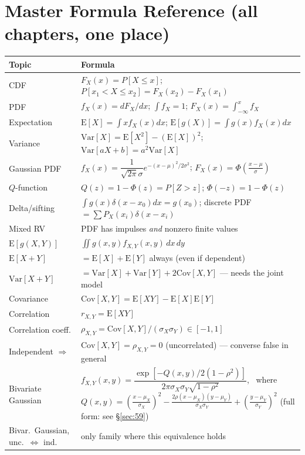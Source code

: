 \documentclass[11pt]{article}
\newcommand{\E}[1]{\mathrm{E}\left[#1\right]}
\newcommand{\Var}[1]{\mathrm{Var}\left[#1\right]}
\newcommand{\Cov}[1]{\mathrm{Cov}\left[#1\right]}
\renewcommand{\P}[1]{P\left[#1\right]}
\begin{document}
\section*{Master Formula Reference (all chapters, one place)}

\small
\begin{longtable}{@{}p{4.0cm}p{10.2cm}@{}}
\toprule
\textbf{Topic} & \textbf{Formula} \\
\midrule
\endhead
CDF & $F_X(x)=\P{X\le x}$; $\P{x_1{<}X{\le}x_2}=F_X(x_2)-F_X(x_1)$\\
PDF & $f_X(x)=dF_X/dx$; $\int f_X=1$; $F_X(x)=\int_{-\infty}^x f_X$\\
Expectation & $\E{X}=\int xf_X(x)dx$; $\E{g(X)}=\int g(x)f_X(x)dx$\\
Variance & $\Var{X}=\E{X^2}-(\E{X})^2$; $\Var{aX+b}=a^2\Var{X}$\\
Gaussian PDF & $f_X(x)=\dfrac{1}{\sqrt{2\pi}\sigma}e^{-(x-\mu)^2/2\sigma^2}$; $F_X(x)=\Phi\!\left(\frac{x-\mu}{\sigma}\right)$\\
$Q$-function & $Q(z)=1-\Phi(z)=\P{Z>z}$; $\Phi(-z)=1-\Phi(z)$\\
Delta/sifting & $\int g(x)\delta(x-x_0)dx=g(x_0)$; discrete PDF $=\sum P_X(x_i)\delta(x-x_i)$\\
Mixed RV & PDF has impulses \emph{and} nonzero finite values\\
$\E{g(X,Y)}$ & $\iint g(x,y)f_{X,Y}(x,y)\,dx\,dy$\\
$\E{X+Y}$ & $=\E{X}+\E{Y}$ always (even if dependent)\\
$\Var{X+Y}$ & $=\Var{X}+\Var{Y}+2\Cov{X,Y}$ --- needs the joint model\\
Covariance & $\Cov{X,Y}=\E{XY}-\E{X}\E{Y}$\\
Correlation & $r_{X,Y}=\E{XY}$\\
Correlation coeff. & $\rho_{X,Y}=\Cov{X,Y}/(\sigma_X\sigma_Y)\in[-1,1]$\\
Independent $\Rightarrow$ & $\Cov{X,Y}=\rho_{X,Y}=0$ (uncorrelated) --- converse false in general\\
Bivariate Gaussian & $f_{X,Y}(x,y)=\dfrac{\exp\!\left[-Q(x,y)/2(1-\rho^2)\right]}{2\pi\sigma_X\sigma_Y\sqrt{1-\rho^2}}$, \ where $Q(x,y)=\left(\frac{x-\mu_X}{\sigma_X}\right)^2-\frac{2\rho(x-\mu_X)(y-\mu_Y)}{\sigma_X\sigma_Y}+\left(\frac{y-\mu_Y}{\sigma_Y}\right)^2$ (full form: see \S\ref{sec:59})\\
Bivar.\ Gaussian, unc.\ $\Leftrightarrow$ ind. & only family where this equivalence holds\\

\end{longtable}
\end{document}
